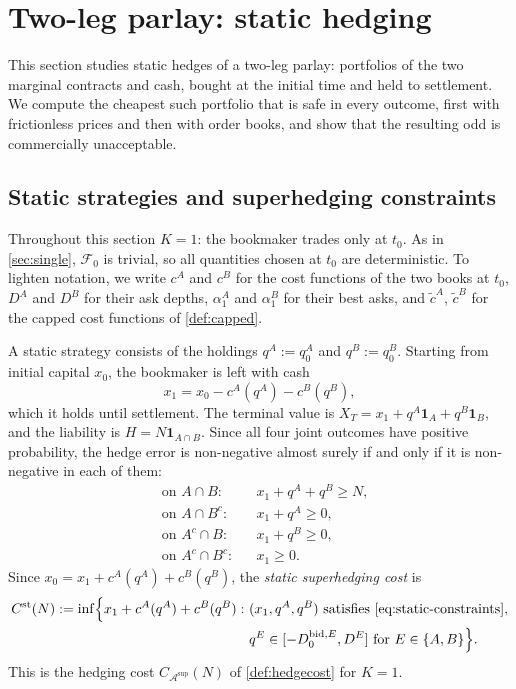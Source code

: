 \documentclass[11pt,a4paper]{article}
\theoremstyle{plain}
\theoremstyle{definition}
\theoremstyle{remark}
\newcommand{\1}{\mathbf{1}}
\newcommand{\F}{\mathcal{F}}
\begin{document}
\section{Two-leg parlay: static hedging}
\label{sec:static}
This section studies static hedges of a two-leg parlay: portfolios of the two marginal contracts and cash, bought at the initial time and held to settlement. We compute the cheapest such portfolio that is safe in every outcome, first with frictionless prices and then with order books, and show that the resulting odd is commercially unacceptable.

\subsection{Static strategies and superhedging constraints}

Throughout this section $K=1$: the bookmaker trades only at $t_0$. As in \cref{sec:single}, $\F_0$ is trivial, so all quantities chosen at $t_0$ are deterministic. To lighten notation, we write $c^A$ and $c^B$ for the cost functions of the two books at $t_0$, $D^A$ and $D^B$ for their ask depths, $\alpha^A_1$ and $\alpha^B_1$ for their best asks, and $\tilde c^A$, $\tilde c^B$ for the capped cost functions of \cref{def:capped}.

A static strategy consists of the holdings $q^A := q^A_0$ and $q^B := q^B_0$. Starting from initial capital $x_0$, the bookmaker is left with cash
\[
x_1 = x_0 - c^A(q^A) - c^B(q^B),
\]
which it holds until settlement. The terminal value is $X_T = x_1 + q^A\1_A + q^B\1_B$, and the liability is $H = N\1_{A\cap B}$. Since all four joint outcomes have positive probability, the hedge error is non-negative almost surely if and only if it is non-negative in each of them:
\begin{equation}
\label{eq:static-constraints}
\begin{aligned}
&\text{on } A\cap B: && x_1 + q^A + q^B\geq N,\\
&\text{on } A\cap B^c: && x_1 + q^A\geq 0,\\
&\text{on } A^c\cap B: && x_1 + q^B\geq 0,\\
&\text{on } A^c\cap B^c: && x_1\geq 0.
\end{aligned}
\end{equation}
Since $x_0 = x_1 + c^A(q^A) + c^B(q^B)$, the \emph{static superhedging cost} is
\[
\begin{aligned}
C^{\mathrm{st}}(N) := \inf\Bigl\{x_1 + c^A(q^A) + c^B(q^B):\ &(x_1,q^A,q^B) \text{ satisfies \eqref{eq:static-constraints}},\\
&q^E\in[-D^{\mathrm{bid},E}_0, D^E] \text{ for } E\in\{A,B\}\Bigr\}.
\end{aligned}
\]
This is the hedging cost $C_{\mathcal{A}^{\mathrm{sup}}}(N)$ of \cref{def:hedgecost} for $K=1$.
\end{document}
